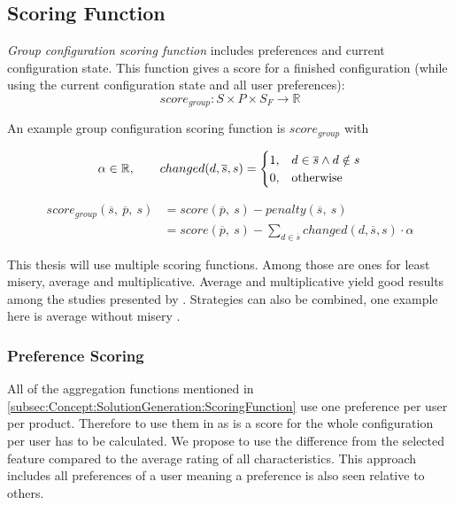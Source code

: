 \begin{samepage}
\subsection{Scoring Function}
\label{subsec:Concept:SolutionGeneration:ScoringFunction}
\emph{Group configuration scoring function} includes preferences and current configuration state. This function gives a score for a finished configuration (while using the current configuration state and all user preferences):
\begin{equation}
    score_{group}: S \times P \times S_F \to \mathbb{R}
\end{equation}

An example group configuration scoring function is $score_{group}$ with

\begin{equation}
    \notag \alpha \in \mathbb{R}, \qquad     changed(d,\overline{s}, s) = 
    \begin{cases}
      1, & d \in \overline{s} \land d \notin s \\
      0, & \text{otherwise}
    \end{cases}
\end{equation}

\begin{equation}
    \begin{split}
        score_{group}(\overline{s},\ \overline{p},\ s)
        & = score(\overline{p},\ s) - penalty(\overline{s},\ s) \\
        & = score(\overline{p},\ s) - \sum_{d \in \overline{s}} changed(d,\overline{s}, s) \cdot \alpha
    \end{split}
\end{equation}

This thesis will use multiple scoring functions. Among those are ones for least misery, average and multiplicative. Average and multiplicative yield good results among the studies presented by \citeauthor{Masthoff2015}. Strategies can also be combined, one example here is average without misery \cite{Masthoff2015}.
\end{samepage}

\subsubsection{Preference Scoring}

All of the aggregation functions mentioned in \autoref{subsec:Concept:SolutionGeneration:ScoringFunction} use one preference per user per product. Therefore to use them in as is a score for the whole configuration per user has to be calculated. We propose to use the difference from the selected feature compared to the average rating of all characteristics. This approach includes all preferences of a user meaning a preference is also seen relative to others.

